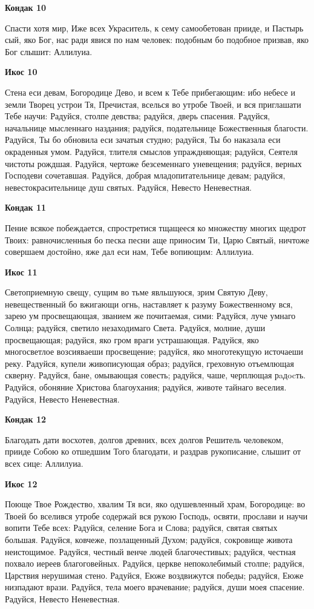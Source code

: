 \bfseries Кондак 10\normalfont{}


Спасти хотя мир, Иже всех Украситель, к сему самообетован прииде, и Пастырь сый, яко Бог, нас ради явися по нам человек: подобным бо подобное призвав, яко Бог слышит: Аллилуиа.


\bfseries Икос 10\normalfont{}


Стена еси девам, Богородице Дево, и всем к Тебе прибегающим: ибо небесе и земли Творец устрои Тя, Пречистая, вселься во утробе Твоей, и вся приглашати Тебе научи: Радуйся, столпе девства; радуйся, дверь спасения. Радуйся, начальнице мысленнаго наздания; радуйся, подательнице Божественныя благости. Радуйся, Ты бо обновила еси зачатыя студно; радуйся, Ты бо наказала еси окраденныя умом. Радуйся, тлителя смыслов упраждняющая; радуйся, Сеятеля чистоты рождшая. Радуйся, чертоже безсеменнаго уневещения; радуйся, верных Господеви сочетавшая. Радуйся, добрая младопитательнице девам; радуйся, невестокрасительнице душ святых. Радуйся, Невесто Неневестная.


\bfseries Кондак 11\normalfont{}


Пение всякое побеждается, спростретися тщащееся ко множеству многих щедрот Твоих: равночисленныя бо песка песни аще приносим Ти, Царю Святый, ничтоже совершаем достойно, яже дал еси нам, Тебе вопиющим: Аллилуиа.


\bfseries Икос 11\normalfont{}


Светоприемную свещу, сущим во тьме явльшуюся, зрим Святую Деву, невещественный бо вжигающи огнь, наставляет к разуму Божественному вся, зарею ум просвещающая, званием же почитаемая, сими: Радуйся, луче умнаго Солнца; радуйся, светило незаходимаго Света. Радуйся, молние, души просвещающая; радуйся, яко гром враги устрашающая. Радуйся, яко многосветлое возсияваеши просвещение; радуйся, яко многотекущую источаеши реку. Радуйся, купели живописующая образ; радуйся, греховную отъемлющая скверну. Радуйся, бане, омывающая совесть; радуйся, чаше, черплющая рaдocть. Радуйся, обоняние Христова благоухания; радуйся, животе тайнаго веселия. Радуйся, Невесто Неневестная.


\bfseries Кондак 12\normalfont{}


Благодать дати восхотев, долгов древних, всех долгов Решитель человеком, прииде Собою ко отшедшим Того благодати, и раздрав рукописание, слышит от всех сице: Аллилуиа.


\bfseries Икос 12\normalfont{}


Поюще Твое Рождество, хвалим Тя вси, яко одушевленный храм, Богородице: во Твоей бо вселився утробе содержай вся рукою Господь, освяти, прослави и научи вопити Тебе всех: Радуйся, селение Бога и Слова; радуйся, святая святых большая. Радуйся, ковчеже, позлащенный Духом; радуйся, сокровище живота неистощимое. Радуйся, честный венче людей благочестивых; радуйся, честная похвало иереев благоговейных. Радуйся, церкве непоколебимый столпе; радуйся, Царствия нерушимая стено. Радуйся, Еюже воздвижутся победы; радуйся, Еюже низпадают врази. Радуйся, тела моего врачевание; радуйся, души моея спасение. Радуйся, Невесто Неневестная.


